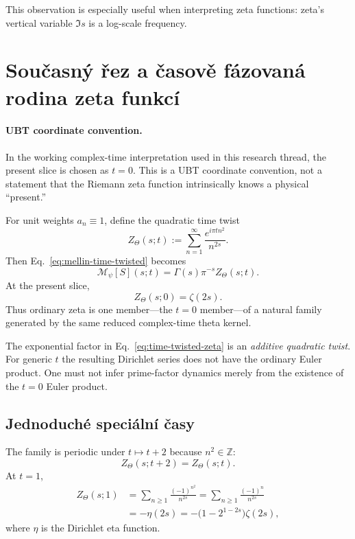 This observation is especially useful when interpreting zeta functions: zeta's vertical
variable $\Im s$ is a log-scale frequency.

\section{Současný řez a časově fázovaná rodina zeta funkcí}
\label{sec:time-twisted-zeta}

\paragraph{UBT coordinate convention.}
In the working complex-time interpretation used in this research thread, the present
slice is chosen as $t=0$.  This is a UBT coordinate convention, not a statement that the
Riemann zeta function intrinsically knows a physical ``present.''

For unit weights $a_n\equiv1$, define the quadratic time twist
\begin{equation}
  Z_\Theta(s;t)
  :=\sum_{n=1}^{\infty}
    \frac{e^{i\pi t n^2}}{n^{2s}}.
  \label{eq:time-twisted-zeta}
\end{equation}
Then Eq.~\eqref{eq:mellin-time-twisted} becomes
\begin{equation}
 \boxed{
  \mathcal M_\psi[S](s;t)
  =\Gamma(s)\pi^{-s}Z_\Theta(s;t).}
 \label{eq:mellin-Ztheta}
\end{equation}
At the present slice,
\begin{equation}
 \boxed{Z_\Theta(s;0)=\zeta(2s).}
 \label{eq:present-zeta}
\end{equation}
Thus ordinary zeta is one member---the $t=0$ member---of a natural family generated by
the same reduced complex-time theta kernel.

\begin{remark}
The exponential factor in Eq.~\eqref{eq:time-twisted-zeta} is an \emph{additive quadratic
twist}.  For generic $t$ the resulting Dirichlet series does not have the ordinary Euler
product.  One must not infer prime-factor dynamics merely from the existence of the
$t=0$ Euler product.
\end{remark}

\subsection{Jednoduché speciální časy}

The family is periodic under $t\mapsto t+2$ because $n^2\in\mathbb Z$:
\begin{equation}
 Z_\Theta(s;t+2)=Z_\Theta(s;t).
\end{equation}
At $t=1$,
\begin{align}
 Z_\Theta(s;1)
 &=\sum_{n\ge1}\frac{(-1)^{n^2}}{n^{2s}}
 =\sum_{n\ge1}\frac{(-1)^n}{n^{2s}}\\
 &=-\eta(2s)
 =-\bigl(1-2^{1-2s}\bigr)\zeta(2s),
 \label{eq:t1-eta}
\end{align}
where $\eta$ is the Dirichlet eta function.

